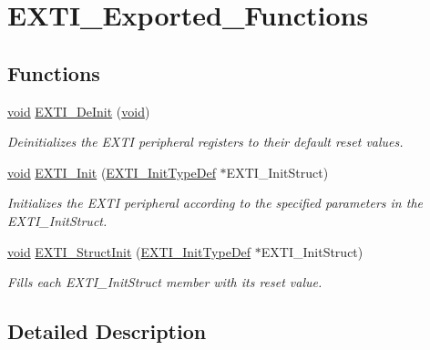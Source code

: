 \hypertarget{group___e_x_t_i___exported___functions}{}\section{E\+X\+T\+I\+\_\+\+Exported\+\_\+\+Functions}
\label{group___e_x_t_i___exported___functions}
\subsection*{Functions}
\begin{DoxyCompactItemize}
\item 
\hyperlink{usb__devapi_8h_afabf60e7f57651d6d595a02c75f07cd0}{void} \hyperlink{group___e_x_t_i___exported___functions_ga07072e339cb9ecb9cd9d4b94afc9f317}{E\+X\+T\+I\+\_\+\+De\+Init} (\hyperlink{usb__devapi_8h_afabf60e7f57651d6d595a02c75f07cd0}{void})
\begin{DoxyCompactList}\small\item\em Deinitializes the E\+X\+TI peripheral registers to their default reset values. \end{DoxyCompactList}\item 
\hyperlink{usb__devapi_8h_afabf60e7f57651d6d595a02c75f07cd0}{void} \hyperlink{group___e_x_t_i___exported___functions_ga8c9ce6352a3a2dfc8fc9287cb24c6501}{E\+X\+T\+I\+\_\+\+Init} (\hyperlink{struct_e_x_t_i___init_type_def}{E\+X\+T\+I\+\_\+\+Init\+Type\+Def} $\ast$E\+X\+T\+I\+\_\+\+Init\+Struct)
\begin{DoxyCompactList}\small\item\em Initializes the E\+X\+TI peripheral according to the specified parameters in the E\+X\+T\+I\+\_\+\+Init\+Struct. \end{DoxyCompactList}\item 
\hyperlink{usb__devapi_8h_afabf60e7f57651d6d595a02c75f07cd0}{void} \hyperlink{group___e_x_t_i___exported___functions_ga86b9e662d18a2f829999cfb26aa7ca20}{E\+X\+T\+I\+\_\+\+Struct\+Init} (\hyperlink{struct_e_x_t_i___init_type_def}{E\+X\+T\+I\+\_\+\+Init\+Type\+Def} $\ast$E\+X\+T\+I\+\_\+\+Init\+Struct)
\begin{DoxyCompactList}\small\item\em Fills each E\+X\+T\+I\+\_\+\+Init\+Struct member with its reset value. \end{DoxyCompactList}\end{DoxyCompactItemize}


\subsection{Detailed Description}


